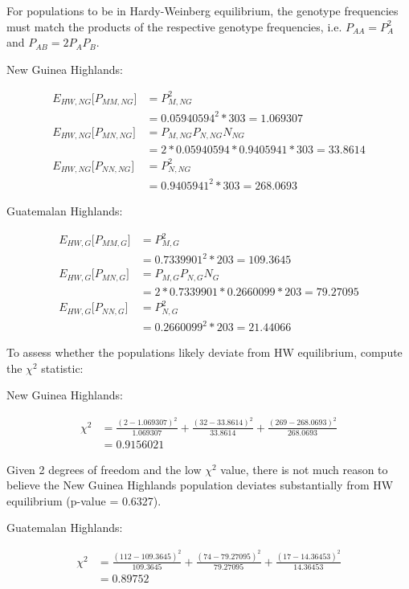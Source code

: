 \documentclass{essay}
\begin{document}
\begin{essaystyle}
For populations to be in Hardy-Weinberg equilibrium, the genotype frequencies
must match the products of the respective genotype frequencies, i.e. $P_{AA} =
P_A^2$ and $P_{AB} = 2P_A P_B$.

New Guinea Highlands:

\begin{align}
  E_{HW,NG}\big[P_{MM,NG}\big] &= P_{M,NG}^2 \\
  &= 0.05940594^2 *303 = 1.069307\\
  E_{HW,NG}\big[P_{MN,NG}\big] &= P_{M,NG}P_{N,NG}N_{NG} \\
  &= 2* 0.05940594*0.9405941*303 = 33.8614\\
  E_{HW,NG}\big[P_{NN,NG}\big] &= P_{N,NG}^2 \\
  &= 0.9405941^2 *303 = 268.0693
\end{align}

Guatemalan Highlands:

\begin{align}
  E_{HW,G}\big[P_{MM,G}\big] &= P_{M,G}^2 \\
  &= 0.7339901^2 *203 = 109.3645 \\
  E_{HW,G}\big[P_{MN,G}\big] &= P_{M,G}P_{N,G}N_{G} \\
  &= 2*0.7339901*0.2660099*203 = 79.27095 \\
  E_{HW,G}\big[P_{NN,G}\big] &= P_{N,G}^2 \\
  &= 0.2660099^2 *203 =21.44066
\end{align}

To assess whether the populations likely deviate from HW equilibrium, compute
the $\chi^2$ statistic:

New Guinea Highlands:

\begin{align}
  \chi^2 &= \frac{(2-1.069307)^2}{1.069307} + \frac{(32-33.8614)^2}{33.8614} + \frac{(269-268.0693)^2}{268.0693} \\
  &= 0.9156021
\end{align}

Given 2 degrees of freedom and the low $\chi^2$ value, there is not much reason
to believe the New Guinea Highlands population deviates substantially from HW
equilibrium (p-value = 0.6327).

Guatemalan Highlands:

\begin{align}
  \chi^2 &= \frac{(112-109.3645)^2}{109.3645} + \frac{(74-79.27095)^2}{79.27095} + \frac{(17-14.36453)^2}{14.36453} \\
  &= 0.89752
\end{align}


\end{essaystyle}
\end{document}
